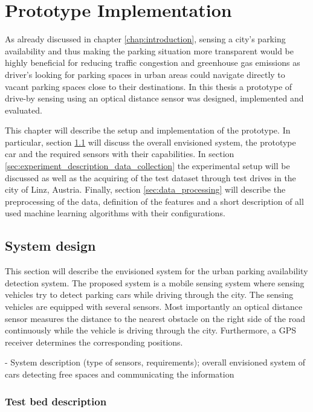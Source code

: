 \chapter{Prototype Implementation}
\label{chap:referenceimplementation}

As already discussed in chapter \ref{chap:introduction}, sensing a city's parking availability and thus making the parking situation more transparent would be highly beneficial for reducing traffic congestion and greenhouse gas emissions as driver's looking for parking spaces in urban areas could navigate directly to vacant parking spaces close to their destinations. In this thesis a prototype of drive-by sensing using an optical distance sensor was designed, implemented and evaluated.

This chapter will describe the setup and implementation of the prototype. In particular, section \ref{sec:system_design} will discuss the overall envisioned system, the prototype car and the required sensors with their capabilities. In section \ref{sec:experiment_description_data_collection} the experimental setup will be discussed as well as the acquiring of the test dataset through test drives in the city of Linz, Austria. Finally, section \ref{sec:data_processing} will describe the preprocessing of the data, definition of the features and a short description of all used machine learning algorithms with their configurations. 

\section{System design}
\label{sec:system_design}

This section will describe the envisioned system for the urban parking availability detection system. The proposed system is a mobile sensing system where sensing vehicles try to detect parking cars while driving through the city. The sensing vehicles are equipped with several sensors. Most importantly an optical distance sensor measures the distance to the nearest obstacle on the right side of the road continuously while the vehicle is driving through the city. Furthermore, a GPS receiver determines the corresponding positions. 

- System description (type of sensors, requirements); overall envisioned system of cars detecting free spaces and communicating the information

\subsection{Test bed description}
\label{sec:test_bed}

